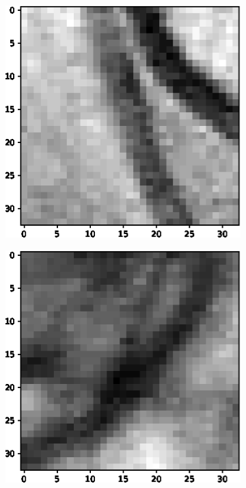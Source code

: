 \documentclass[aps,prb,10pt,twocolumn,groupedaddress]{revtex4-1}
\begin{document}
\begin{figure}[!t]
\begin{subfigure}[]{0.22\textwidth}
		\includegraphics[width=\textwidth]{images/positive2.eps}
		\caption{}
	\end{subfigure}
	\hspace{1.55cm}
	\centering
	\begin{subfigure}[]{0.22\textwidth}
		\centering
		\includegraphics[width=\textwidth]{images/positive3.eps}

\end{subfigure}
\end{figure}
\end{document}
